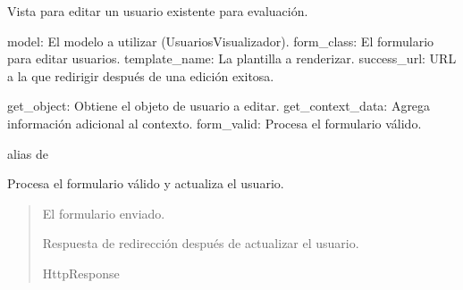 \documentclass[letterpaper,10pt,spanish]{sphinxmanual}
\begin{document}
\begin{fulllineitems}

\pysigstartsignatures
{}
\pysigstopsignatures
\sphinxAtStartPar
Vista para editar un usuario existente para evaluación.
\begin{description}
\sphinxAtStartPar
model: El modelo a utilizar (UsuariosVisualizador).
form\_class: El formulario para editar usuarios.
template\_name: La plantilla a renderizar.
success\_url: URL a la que redirigir después de una edición exitosa.

\sphinxAtStartPar
get\_object: Obtiene el objeto de usuario a editar.
get\_context\_data: Agrega información adicional al contexto.
form\_valid: Procesa el formulario válido.

\end{description}


\begin{fulllineitems}

\pysigstartsignatures
{}
\pysigstopsignatures
\sphinxAtStartPar
alias de 

\end{fulllineitems}



\begin{fulllineitems}

\pysigstartsignatures
{}
\pysigstopsignatures
\sphinxAtStartPar
Procesa el formulario válido y actualiza el usuario.
\begin{quote}\begin{description}
\sphinxAtStartPar
{} \textendash{} El formulario enviado.

\sphinxAtStartPar
Respuesta de redirección después de actualizar el usuario.

\sphinxAtStartPar
HttpResponse

\end{description}\end{quote}


\end{fulllineitems}
\end{fulllineitems}
\end{document}
